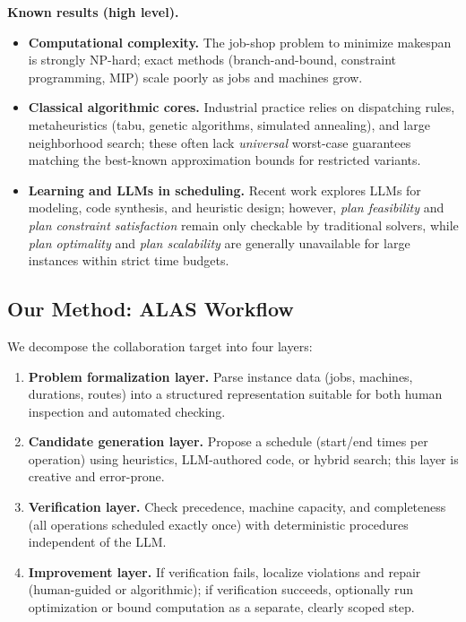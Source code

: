 \documentclass[11pt]{article}
\begin{document}
\textbf{Known results (high level).}
\begin{itemize}[noitemsep]
  \item \textbf{Computational complexity.} The job-shop problem to minimize makespan is strongly NP-hard; exact methods (branch-and-bound, constraint programming, MIP) scale poorly as jobs and machines grow.
  \item \textbf{Classical algorithmic cores.} Industrial practice relies on dispatching rules, metaheuristics (tabu, genetic algorithms, simulated annealing), and large neighborhood search; these often lack \emph{universal} worst-case guarantees matching the best-known approximation bounds for restricted variants.
  \item \textbf{Learning and LLMs in scheduling.} Recent work explores LLMs for modeling, code synthesis, and heuristic design; however, \emph{plan feasibility} and \emph{plan constraint satisfaction} remain only checkable by traditional solvers, while \emph{plan optimality} and \emph{plan scalability} are generally unavailable for large instances within strict time budgets.
\end{itemize}

\subsection{Our Method: ALAS Workflow}
We decompose the collaboration target into four layers:
\begin{enumerate}[label=\textbf{L\arabic*.}, leftmargin=*]
  \item \textbf{Problem formalization layer.} Parse instance data (jobs, machines, durations, routes) into a structured representation suitable for both human inspection and automated checking.
  \item \textbf{Candidate generation layer.} Propose a schedule (start/end times per operation) using heuristics, LLM-authored code, or hybrid search; this layer is creative and error-prone.
  \item \textbf{Verification layer.} Check precedence, machine capacity, and completeness (all operations scheduled exactly once) with deterministic procedures independent of the LLM.
  \item \textbf{Improvement layer.} If verification fails, localize violations and repair (human-guided or algorithmic); if verification succeeds, optionally run optimization or bound computation as a separate, clearly scoped step.
\end{enumerate}
\end{document}
